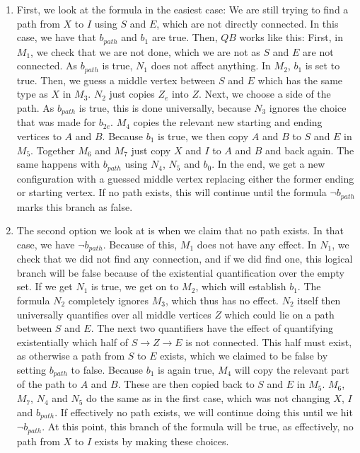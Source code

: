 \begin{enumerate}
    \item First, we look at the formula in the easiest case: We are still trying to find a path from $X$ to $I$ using $S$ and $E$, which are not directly connected.
    In this case, we have that $b_{path}$ and $b_1$ are true.
    Then, $QB$ works like this:
    First, in $M_1$, we check that we are not done, which we are not as $S$ and $E$ are not connected.
    As $b_{path}$ is true, $N_1$ does not affect anything.
    In $M_2$, $b_1$ is set to true.
    Then, we guess a middle vertex between $S$ and $E$ which has the same type as $X$ in $M_3$.
    $N_2$ just copies $Z_e$ into $Z$.
    Next, we choose a side of the path.
    As $b_{path}$ is true, this is done universally, because $N_3$ ignores the choice that was made for $b_{2e}$.
    $M_4$ copies the relevant new starting and ending vertices to $A$ and $B$.
    Because $b_1$ is true, we then copy $A$ and $B$ to $S$ and $E$ in $M_5$.
    Together $M_6$ and $M_7$ just copy $X$ and $I$ to $A$ and $B$ and back again.
    The same happens with $b_{path}$ using $N_4$, $N_5$ and $b_0$.
    In the end, we get a new configuration with a guessed middle vertex replacing either the former ending or starting vertex.
    If no path exists, this will continue until the formula $\neg b_{path}$ marks this branch as false.

    \item The second option we look at is when we claim that no path exists.
    In that case, we have $\neg b_{path}$.
    Because of this, $M_1$ does not have any effect.
    In $N_1$, we check that we did not find any connection, and if we did find one, this logical branch will be false because of the existential quantification over the empty set.
    If we get $N_1$ is true, we get on to $M_2$, which will establish $b_1$.
    The formula $N_2$ completely ignores $M_3$, which thus has no effect.
    $N_2$ itself then universally quantifies over all middle vertices $Z$ which could lie on a path between $S$ and $E$.
    The next two quantifiers have the effect of quantifying existentially which half of $S \to Z \to E$ is not connected.
    This half must exist, as otherwise a path from $S$ to $E$ exists, which we claimed to be false by setting $b_{path}$ to false.
    Because $b_1$ is again true, $M_4$ will copy the relevant part of the path to $A$ and $B$.
    These are then copied back to $S$ and $E$ in $M_5$.
    $M_6$, $M_7$, $N_4$ and $N_5$ do the same as in the first case, which was not changing $X$, $I$ and $b_{path}$.
    If effectively no path exists, we will continue doing this until we hit $\neg b_{path}$.
    At this point, this branch of the formula will be true, as effectively, no path from $X$ to $I$ exists by making these choices.


\end{enumerate}
